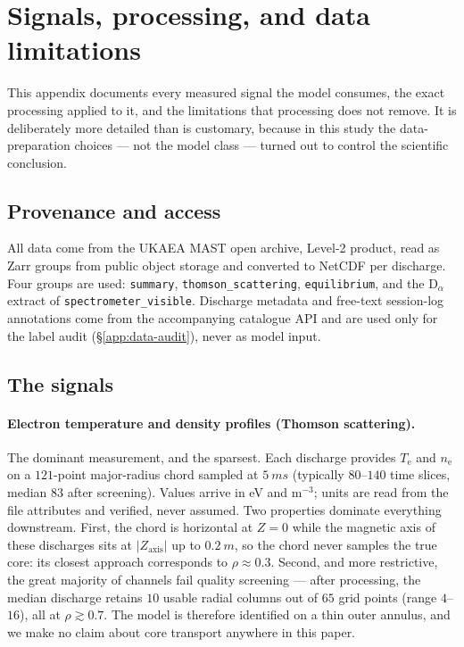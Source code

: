 
\section{Signals, processing, and data limitations}
\label{app:data}

This appendix documents every measured signal the model consumes, the exact
processing applied to it, and the limitations that processing does not
remove. It is deliberately more detailed than is customary, because in this
study the data-preparation choices --- not the model class --- turned out to
control the scientific conclusion.

\subsection{Provenance and access}

All data come from the UKAEA MAST open archive, Level-2 product, read as
Zarr groups from public object storage and converted to NetCDF per
discharge. Four groups are used: \texttt{summary}, \texttt{thomson\_scattering},
\texttt{equilibrium}, and the D$_\alpha$ extract of
\texttt{spectrometer\_visible}. Discharge metadata and free-text session-log
annotations come from the accompanying catalogue API and are used only for
the label audit (\S\ref{app:data-audit}), never as model input.

\subsection{The signals}
\label{app:data-signals}

\paragraph{Electron temperature and density profiles (Thomson scattering).}
The dominant measurement, and the sparsest. Each discharge provides
$T_{\mathrm{e}}$ and $n_{\mathrm{e}}$ on a $121$-point major-radius chord
sampled at $\SI{5}{ms}$ (typically $80$--$140$ time slices, median $83$
after screening). Values arrive in eV and m$^{-3}$; units are read from the
file attributes and verified, never assumed. Two properties dominate
everything downstream. First, the chord is horizontal at $Z = 0$ while the
magnetic axis of these discharges sits at $|Z_{\mathrm{axis}}|$ up to
$\SI{0.2}{m}$, so the chord never samples the true core: its closest
approach corresponds to $\rho \approx 0.3$. Second, and more restrictive,
the great majority of channels fail quality screening --- after processing,
the median discharge retains $10$ usable radial columns out of $65$ grid
points (range $4$--$16$), all at $\rho \gtrsim 0.7$. The model is therefore
identified on a thin outer annulus, and we make no claim about core
transport anywhere in this paper.

